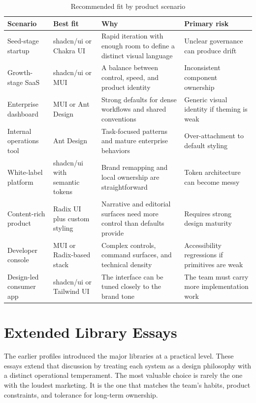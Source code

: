 \documentclass[11pt,twoside,a4paper]{article}
\begin{document}
\begin{table}[htbp]
  \centering
  \caption{Recommended fit by product scenario}
  \begin{tabularx}{\textwidth}{@{}p{}p{}p{}Y@{}}
    \toprule
    \textbf{Scenario} & \textbf{Best fit} & \textbf{Why} & \textbf{Primary risk} \\
    \midrule
    Seed-stage startup & shadcn/ui or Chakra UI & Rapid iteration with enough room to define a distinct visual language & Unclear governance can produce drift \\
    Growth-stage SaaS & shadcn/ui or MUI & A balance between control, speed, and product identity & Inconsistent component ownership \\
    Enterprise dashboard & MUI or Ant Design & Strong defaults for dense workflows and shared conventions & Generic visual identity if theming is weak \\
    Internal operations tool & Ant Design & Task-focused patterns and mature enterprise behaviors & Over-attachment to default styling \\
    White-label platform & shadcn/ui with semantic tokens & Brand remapping and local ownership are straightforward & Token architecture can become messy \\
    Content-rich product & Radix UI plus custom styling & Narrative and editorial surfaces need more control than defaults provide & Requires strong design maturity \\
    Developer console & MUI or Radix-based stack & Complex controls, command surfaces, and technical density & Accessibility regressions if primitives are weak \\
    Design-led consumer app & shadcn/ui or Tailwind UI & The interface can be tuned closely to the brand tone & The team must carry more implementation work \\
    \bottomrule
  \end{tabularx}
\end{table}

\section{Extended Library Essays}
The earlier profiles introduced the major libraries at a practical level. These essays extend that discussion by treating each system as a design philosophy with a distinct operational temperament. The most valuable choice is rarely the one with the loudest marketing. It is the one that matches the team's habits, product constraints, and tolerance for long-term ownership.
\end{document}
